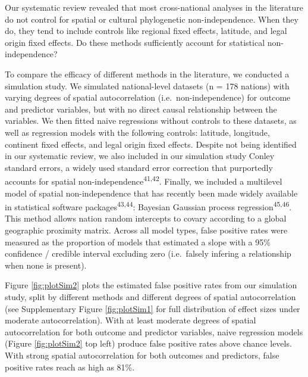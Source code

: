 \documentclass[
  english,
  man,floatsintext]{apa6}
\begin{document}
Our systematic review revealed that most cross-national analyses in the literature do not control for spatial or cultural phylogenetic non-independence. When they do, they tend to include controls like regional fixed effects, latitude, and legal origin fixed effects. Do these methods sufficiently account for statistical non-independence?

To compare the efficacy of different methods in the literature, we conducted a simulation study. We simulated national-level datasets (n = 178 nations) with varying degrees of spatial autocorrelation (i.e.~non-independence) for outcome and predictor variables, but with no direct causal relationship between the variables. We then fitted naive regressions without controls to these datasets, as well as regression models with the following controls: latitude, longitude, continent fixed effects, and legal origin fixed effects. Despite not being identified in our systematic review, we also included in our simulation study Conley standard errors, a widely used standard error correction that purportedly accounts for spatial non-independence\textsuperscript{41,42}. Finally, we included a multilevel model of spatial non-independence that has recently been made widely available in statistical software packages\textsuperscript{43,44}: Bayesian Gaussian process regression\textsuperscript{45,46}. This method allows nation random intercepts to covary according to a global geographic proximity matrix. Across all model types, false positive rates were measured as the proportion of models that estimated a slope with a 95\% confidence / credible interval excluding zero (i.e.~falsely infering a relationship when none is present).

Figure \ref{fig:plotSim2} plots the estimated false positive rates from our simulation study, split by different methods and different degrees of spatial autocorrelation (see Supplementary Figure \ref{fig:plotSim1} for full distribution of effect sizes under moderate autocorrelation). With at least moderate degrees of spatial autocorrelation for both outcome and predictor variables, naive regression models (Figure \ref{fig:plotSim2} top left) produce false positive rates above chance levels. With strong spatial autocorrelation for both outcomes and predictors, false positive rates reach as high as 81\%.
\end{document}
